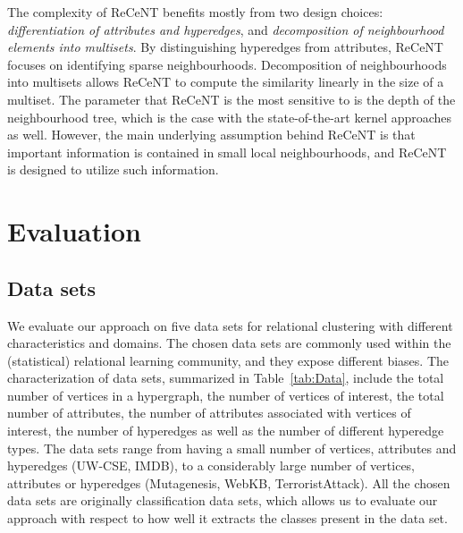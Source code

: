 The complexity of ReCeNT benefits mostly from two design choices: \textit{differentiation of attributes and hyperedges}, and \textit{decomposition of neighbourhood elements into multisets}.
By distinguishing hyperedges from attributes, ReCeNT focuses on identifying sparse neighbourhoods.  
Decomposition of neighbourhoods into multisets allows ReCeNT to compute the similarity linearly in the size of a multiset. 
The parameter that ReCeNT is the most sensitive to is the depth of the neighbourhood tree, which is the case with the state-of-the-art kernel approaches as well.
However, the main underlying assumption behind ReCeNT is that important information is contained in small local neighbourhoods, and ReCeNT is designed to utilize such information.


\section{Evaluation}
\label{sec:Evaluation}



\subsection{Data sets}



We evaluate our approach on five data sets for relational clustering with different characteristics and domains.
The chosen data sets are commonly used within the (statistical) relational learning community, and they expose different biases. 
The characterization of data sets, summarized in Table~\ref{tab:Data}, include the total number of vertices in a hypergraph, the number of vertices of interest, the total number of attributes, the number of attributes associated with vertices of interest, the number of hyperedges as well as the number of different hyperedge types.
The data sets range from having a small number of vertices, attributes and hyperedges (UW-CSE, IMDB), to a considerably large number of vertices, attributes or hyperedges (Mutagenesis, WebKB, TerroristAttack).
All the chosen data sets are originally classification data sets, which allows us to evaluate our approach with respect to how well it extracts the classes present in the data set.
\vspace{2pt}



